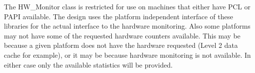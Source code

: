 %



The HW\_Monitor class is restricted for use on machines that either
have PCL or PAPI available. The design uses the platform independent
interface of these libraries for the actual interface to the hardware
monitoring. Also some platforms may not have some of the requested hardware
counters available. This may be because a given platform does not have 
the hardware requested (Level 2 data cache for example), or it may be because
hardware monitoring is not available. In either case only the available
statistics will be provided.
